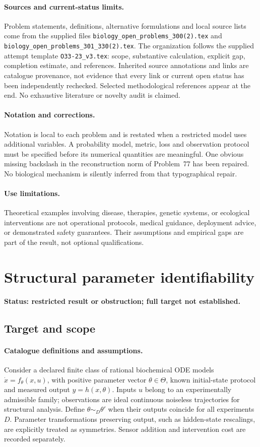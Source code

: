 \documentclass[11pt]{article}
\begin{document}
\paragraph{Sources and current-status limits.}
Problem statements, definitions, alternative formulations and local source lists
come from the supplied files
\texttt{biology\_open\_problems\_300(2).tex} and
\texttt{biology\_open\_problems\_301\_330(2).tex}.
The organization follows the supplied attempt template
\texttt{O33-23\_v3.tex}: scope, substantive calculation, explicit gap,
completion estimate, and references. Inherited source annotations and links are
catalogue provenance, not evidence that every link or current open status has
been independently rechecked. Selected methodological references appear at the
end. No exhaustive literature or novelty audit is claimed.

\paragraph{Notation and corrections.}
Notation is local to each problem and is restated when a restricted model uses
additional variables. A probability model, metric, loss and observation protocol
must be specified before its numerical quantities are meaningful. One obvious
missing backslash in the reconstruction norm of Problem~77 has been repaired.
No biological mechanism is silently inferred from that typographical repair.

\paragraph{Use limitations.}
Theoretical examples involving disease, therapies, genetic systems, or ecological
interventions are not operational protocols, medical guidance, deployment advice,
or demonstrated safety guarantees. Their assumptions and empirical gaps are part
of the result, not optional qualifications.


\section*{Structural parameter identifiability}
\label{prob:043}
\noindent\textbf{Status: restricted result or obstruction; full target not established.}
\subsection{Target and scope}
\paragraph{Catalogue definitions and assumptions.}
Consider a declared finite class of rational biochemical ODE models $\dot x=f_\theta(x,u)$, with positive parameter vector $\theta\in\Theta$, known initial-state protocol and measured output $y=h(x,\theta)$. Inputs $u$ belong to an experimentally admissible family; observations are ideal continuous noiseless trajectories for structural analysis. Define $\theta\sim_D\theta'$ when their outputs coincide for all experiments $D$. Parameter transformations preserving output, such as hidden-state rescalings, are explicitly treated as symmetries. Sensor addition and intervention cost are recorded separately.
\end{document}

